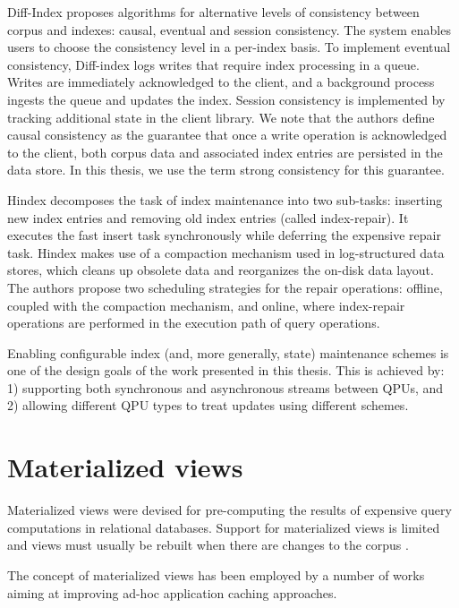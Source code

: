 Diff-Index \cite{tan:diffindex} proposes algorithms for alternative levels of consistency between corpus and indexes:
causal, eventual and session consistency.
The system enables users to choose the consistency level in a per-index basis.
To implement eventual consistency, Diff-index logs writes that require index processing in a queue.
Writes are immediately acknowledged to the client, and a background process ingests the queue and updates the index.
Session consistency is implemented by tracking additional state in the client library.
We note that the authors define causal consistency as the guarantee that once a write operation is
acknowledged to the client, both corpus data and associated index entries are persisted in the data store.
In this thesis, we use the term strong consistency for this guarantee.

Hindex \cite{tang:deferredindexing} decomposes the task of index maintenance into two sub-tasks:
inserting new index entries and removing old index entries (called index-repair).
It executes the fast insert task synchronously while deferring the expensive repair task.
Hindex makes use of a compaction mechanism used in log-structured data stores,
which cleans up obsolete data and reorganizes the on-disk data layout.
The authors propose two scheduling strategies for the repair operations:
offline, coupled with the compaction mechanism,
and online, where index-repair operations are performed in the execution path of query operations.

\bigskip
\noindent
Enabling configurable index (and, more generally, state) maintenance schemes is one of the design goals of the work
presented in this thesis.
This is achieved by: 1) supporting both synchronous and asynchronous streams between QPUs,
and 2) allowing different QPU types to treat updates using different schemes.

\section{Materialized views}
\label{sec:mv}
Materialized views were devised for pre-computing the results of expensive query computations in relational databases.
Support for materialized views is limited \cite{mysql:mvs} and views must usually be rebuilt when there are changes to
the corpus \cite{postgresql:mvs}.

The concept of materialized views has been employed by a number of works \cite{kate:pequod, amiri:dbproxy, gjengset:noria}
aiming at improving ad-hoc application caching approaches.

